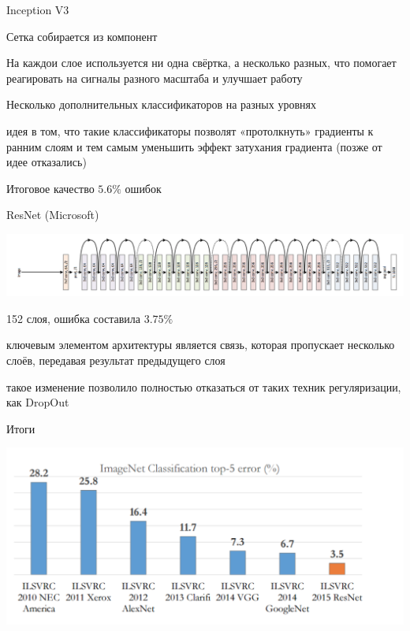 \documentclass[notes,12pt, aspectratio=169]{beamer}
\newenvironment{wideitemize}{\itemize\addtolength{\itemsep}{10pt}}{\enditemize}
\begin{document}
\begin{frame}{Inception V3}
\begin{wideitemize}
\item  Сетка собирается из компонент 

\item На каждои слое используется ни одна свёртка, а несколько разных, что помогает реагировать на сигналы разного масштаба и улучшает работу

\item Несколько дополнительных классификаторов на разных уровнях

\item идея в том, что такие классификаторы позволят «протолкнуть» градиенты к ранним слоям и тем самым уменьшить эффект затухания градиента (позже от идее отказались)

\item Итоговое качество $5.6\%$ ошибок 
\end{wideitemize}
\end{frame}



\begin{frame}{ResNet (Microsoft)}
\begin{center}
\includegraphics[width=.9\linewidth]{resnet.png}
\end{center}

\begin{wideitemize}
\item 152 слоя, ошибка составила $3.75\%$

\item ключевым элементом архитектуры является связь, которая пропускает несколько слоёв, передавая результат предыдущего слоя

\item такое изменение позволило полностью отказаться от таких техник регуляризации, как DropOut

\end{wideitemize}
\end{frame}


\begin{frame}{Итоги}
\begin{center}
\includegraphics[width=.9\linewidth]{top-5.png}
\end{center}
\end{frame}
\end{document}
